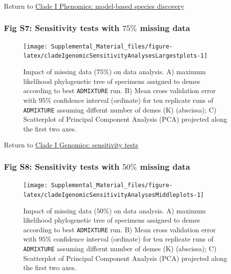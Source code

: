 \documentclass[
  11pt,
]{article}
\begin{document}
Return to \protect\hyperlink{model-based-species-discovery}{Clade I Phenomics: model-based species discovery}
\pagebreak

\hypertarget{fig-s7-sensitivity-tests-with-75-missing-data}{%
\subsubsection{\texorpdfstring{Fig S7: Sensitivity tests with \(75\%\) missing data}{Fig S7: Sensitivity tests with 75\textbackslash\% missing data}}\label{fig-s7-sensitivity-tests-with-75-missing-data}}

\begin{figure}
\texttt{[image: Supplemental\_Material\_files/figure-latex/cladeIgenomicSensitivityAnalysesLargestplots-1]} \caption{Impact of missing data ($75\%$) on data analysis. A) maximum likelihood phylogenetic tree of specimens assigned to demes according to best \texttt{ADMIXTURE} run. B) Mean cross validation error with $95\%$ confidence interval (ordinate) for ten replicate runs of \texttt{ADMIXTURE} assuming differnt number of demes (K) (abscissa); C) Scatterplot of Principal Component Analysis (PCA) projected along the first two axes.}\label{fig:cladeIgenomicSensitivityAnalysesLargestplots}
\end{figure}

Return to \protect\hyperlink{sensitivity-tests}{Clade I Genomics: sensitivity tests}
\pagebreak

\hypertarget{fig-s8-sensitivity-tests-with-50-missing-data}{%
\subsubsection{\texorpdfstring{Fig S8: Sensitivity tests with \(50\%\) missing data}{Fig S8: Sensitivity tests with 50\textbackslash\% missing data}}\label{fig-s8-sensitivity-tests-with-50-missing-data}}

\begin{figure}
\texttt{[image: Supplemental\_Material\_files/figure-latex/cladeIgenomicSensitivityAnalysesMiddleplots-1]} \caption{Impact of missing data ($50\%$) on data analysis. A) maximum likelihood phylogenetic tree of specimens assigned to demes according to best \texttt{ADMIXTURE} run. B) Mean cross validation error with $95\%$ confidence interval (ordinate) for ten replicate runs of \texttt{ADMIXTURE} assuming differnt number of demes (K) (abscissa); C) Scatterplot of Principal Component Analysis (PCA) projected along the first two axes.}\label{fig:cladeIgenomicSensitivityAnalysesMiddleplots}
\end{figure}
\end{document}
